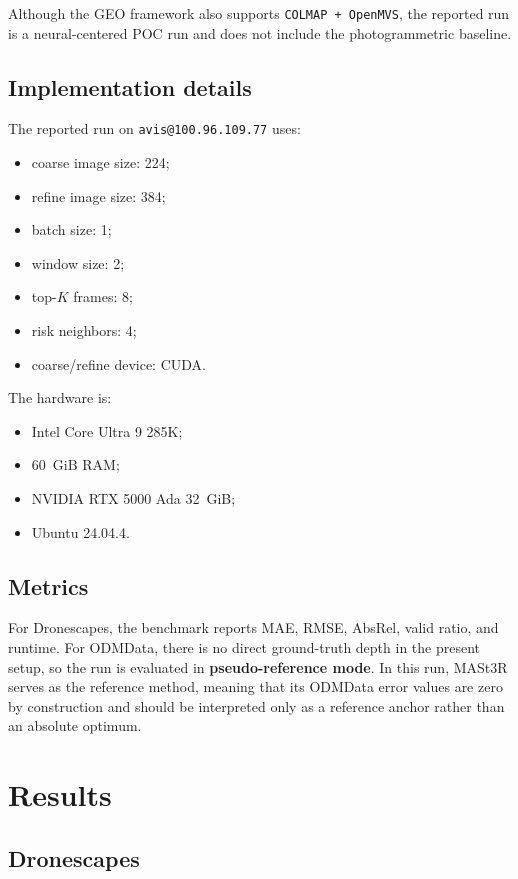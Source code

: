 \documentclass[preprint,12pt]{elsarticle}
\begin{document}
Although the GEO framework also supports \texttt{COLMAP + OpenMVS}, the reported run is a neural-centered POC run and does not include the photogrammetric baseline.

\subsection{Implementation details}

The reported run on \texttt{avis@100.96.109.77} uses:
\begin{itemize}[leftmargin=1.5em]
  \item coarse image size: 224;
  \item refine image size: 384;
  \item batch size: 1;
  \item window size: 2;
  \item top-$K$ frames: 8;
  \item risk neighbors: 4;
  \item coarse/refine device: CUDA.
\end{itemize}

The hardware is:
\begin{itemize}[leftmargin=1.5em]
  \item Intel Core Ultra 9 285K;
  \item 60~GiB RAM;
  \item NVIDIA RTX 5000 Ada 32~GiB;
  \item Ubuntu 24.04.4.
\end{itemize}

\subsection{Metrics}

For Dronescapes, the benchmark reports MAE, RMSE, AbsRel, valid ratio, and runtime. For ODMData, there is no direct ground-truth depth in the present setup, so the run is evaluated in \textbf{pseudo-reference mode}. In this run, MASt3R serves as the reference method, meaning that its ODMData error values are zero by construction and should be interpreted only as a reference anchor rather than an absolute optimum.

\section{Results}

\subsection{Dronescapes}
\end{document}
